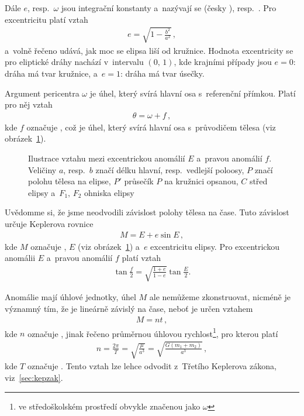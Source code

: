 \documentclass[A4paper, 12pt, oneside]{book}
\begin{document}
Dále $e$, resp.\ $\omega$ jsou integrační konstanty a~nazývají se  (česky ), resp.\ . Pro excentricitu platí vztah
\begin{align}
	e=\sqrt{1-\frac{b^2}{a^2}}\,,
\end{align}
a~volně řečeno udává, jak moc se elipsa liší od kružnice. Hodnota excentricity se pro eliptické dráhy nachází v~intervalu $(0,\,1)$, kde krajními případy jsou $e=0$: dráha má tvar kružnice, a~$e=1$: dráha má tvar úsečky.

Argument pericentra $\omega$ je úhel, který svírá hlavní osa s~referenční přímkou. Platí pro něj vztah
\begin{align}
	\theta=\omega+f\,,
\end{align}
kde $f$ označuje , což je úhel, který svírá hlavní osa s~průvodičem tělesa (viz obrázek~\ref{fig:E}).

\begin{figure}[!htb] 
	\centering
	\caption{Ilustrace vztahu mezi excentrickou anomálií $E$ a~pravou anomálií $f$. Veličiny $a$, resp.\ $b$ značí délku hlavní, resp.\ vedlejší poloosy, $P$ značí polohu tělesa na elipse, $P'$ průsečík $P$ na kružnici opsanou, $C$ střed elipsy a~$F_1,\,F_2$ ohniska elipsy} \label{fig:E}
\end{figure}

Uvědomme si, že jsme neodvodili závislost polohy tělesa na čase. Tuto závislost určuje Keplerova rovnice
\begin{align} \label{eq:kepler}
M = E + e\sin E\,,
\end{align}
kde $M$ označuje , $E$  (viz obrázek~\ref{fig:E}) a~$e$ excentricitu elipsy. Pro excentrickou anomálii $E$ a~pravou anomálií $f$ platí vztah
\begin{align} \label {eq:fE}
	\tan \frac{f}{2} = \sqrt{\frac{1+e}{1-e}}\tan \frac{E}{2}.
\end{align}

Anomálie mají úhlové jednotky, úhel $M$ ale nemůžeme zkonstruovat, nicméně je významný tím, že je lineárně závislý na čase, neboť je určen vztahem 
\begin{align} \label{eq:M}
	M=nt\,,
\end{align}
kde $n$ označuje , jinak řečeno průměrnou úhlovou rychlost\footnote{ve středoškolském prostředí obvykle značenou jako $\omega$}, pro kterou platí
\begin{align} \label{eq:n}
	n=\frac{2\pi}{T}=\sqrt{\frac{\mu}{a^3}}=\sqrt{\frac{G(m_1+m_2)}{a^3}}\,,
\end{align}
kde $T$ označuje . Tento vztah lze lehce odvodit z~Třetího Keplerova zákona, viz~\ref{sec:kepzak}.
\end{document}
